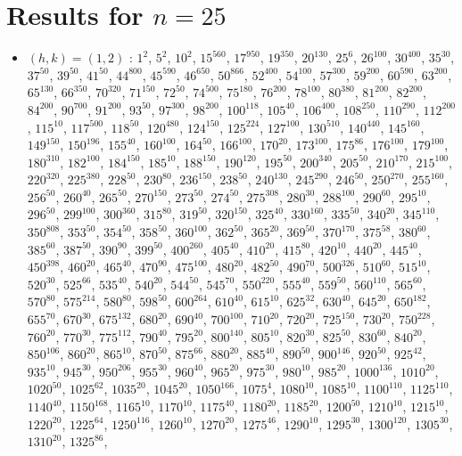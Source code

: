 \section{Results for $n=25$}
\begin{itemize}
\item $(h,k)=(1,2)$ : $1^{2}$, $5^{2}$, $10^{2}$, $15^{560}$, $17^{950}$, $19^{350}$, $20^{130}$, $25^{6}$, $26^{100}$, $30^{400}$, $35^{30}$, $37^{50}$, $39^{50}$, $41^{50}$, $44^{800}$, $45^{590}$, $46^{650}$, $50^{866}$, $52^{400}$, $54^{100}$, $57^{300}$, $59^{200}$, $60^{590}$, $63^{200}$, $65^{130}$, $66^{350}$, $70^{320}$, $71^{150}$, $72^{50}$, $74^{500}$, $75^{180}$, $76^{200}$, $78^{100}$, $80^{380}$, $81^{200}$, $82^{200}$, $84^{200}$, $90^{700}$, $91^{200}$, $93^{50}$, $97^{300}$, $98^{200}$, $100^{118}$, $105^{40}$, $106^{400}$, $108^{250}$, $110^{290}$, $112^{200}$, $115^{10}$, $117^{500}$, $118^{50}$, $120^{480}$, $124^{150}$, $125^{224}$, $127^{100}$, $130^{510}$, $140^{440}$, $145^{160}$, $149^{150}$, $150^{196}$, $155^{40}$, $160^{100}$, $164^{50}$, $166^{100}$, $170^{20}$, $173^{100}$, $175^{86}$, $176^{100}$, $179^{100}$, $180^{310}$, $182^{100}$, $184^{150}$, $185^{10}$, $188^{150}$, $190^{120}$, $195^{50}$, $200^{340}$, $205^{50}$, $210^{170}$, $215^{100}$, $220^{320}$, $225^{380}$, $228^{50}$, $230^{80}$, $236^{150}$, $238^{50}$, $240^{130}$, $245^{290}$, $246^{50}$, $250^{270}$, $255^{160}$, $256^{50}$, $260^{40}$, $265^{50}$, $270^{150}$, $273^{50}$, $274^{50}$, $275^{308}$, $280^{30}$, $288^{100}$, $290^{60}$, $295^{10}$, $296^{50}$, $299^{100}$, $300^{360}$, $315^{80}$, $319^{50}$, $320^{150}$, $325^{40}$, $330^{160}$, $335^{50}$, $340^{20}$, $345^{110}$, $350^{808}$, $353^{50}$, $354^{50}$, $358^{50}$, $360^{100}$, $362^{50}$, $365^{20}$, $369^{50}$, $370^{170}$, $375^{58}$, $380^{60}$, $385^{60}$, $387^{50}$, $390^{90}$, $399^{50}$, $400^{260}$, $405^{40}$, $410^{20}$, $415^{80}$, $420^{10}$, $440^{20}$, $445^{40}$, $450^{398}$, $460^{20}$, $465^{40}$, $470^{90}$, $475^{100}$, $480^{20}$, $482^{50}$, $490^{70}$, $500^{326}$, $510^{60}$, $515^{10}$, $520^{30}$, $525^{66}$, $535^{40}$, $540^{20}$, $544^{50}$, $545^{70}$, $550^{220}$, $555^{40}$, $559^{50}$, $560^{110}$, $565^{60}$, $570^{80}$, $575^{214}$, $580^{80}$, $598^{50}$, $600^{264}$, $610^{40}$, $615^{10}$, $625^{32}$, $630^{40}$, $645^{20}$, $650^{182}$, $655^{70}$, $670^{30}$, $675^{132}$, $680^{20}$, $690^{40}$, $700^{100}$, $710^{20}$, $720^{20}$, $725^{150}$, $730^{20}$, $750^{228}$, $760^{20}$, $770^{30}$, $775^{112}$, $790^{40}$, $795^{20}$, $800^{140}$, $805^{10}$, $820^{30}$, $825^{50}$, $830^{60}$, $840^{20}$, $850^{106}$, $860^{20}$, $865^{10}$, $870^{50}$, $875^{66}$, $880^{20}$, $885^{40}$, $890^{50}$, $900^{146}$, $920^{50}$, $925^{42}$, $935^{10}$, $945^{30}$, $950^{206}$, $955^{30}$, $960^{40}$, $965^{20}$, $975^{30}$, $980^{10}$, $985^{20}$, $1000^{136}$, $1010^{20}$, $1020^{50}$, $1025^{62}$, $1035^{20}$, $1045^{20}$, $1050^{166}$, $1075^{4}$, $1080^{10}$, $1085^{10}$, $1100^{110}$, $1125^{110}$, $1140^{40}$, $1150^{168}$, $1165^{10}$, $1170^{10}$, $1175^{40}$, $1180^{20}$, $1185^{20}$, $1200^{50}$, $1210^{10}$, $1215^{10}$, $1220^{20}$, $1225^{64}$, $1250^{116}$, $1260^{10}$, $1270^{20}$, $1275^{46}$, $1290^{10}$, $1295^{30}$, $1300^{120}$, $1305^{30}$, $1310^{20}$, $1325^{86}$, 
\end{itemize}
